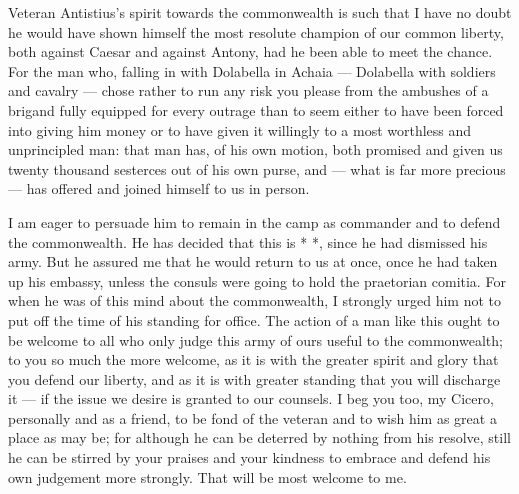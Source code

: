 

 Veteran Antistius's spirit towards the commonwealth is such that I have no doubt he would have shown himself the most resolute champion of our common liberty, both against Caesar and against Antony, had he been able to meet the chance. For the man who, falling in with Dolabella in Achaia --- Dolabella with soldiers and cavalry --- chose rather to run any risk you please from the ambushes of a brigand fully equipped for every outrage than to seem either to have been forced into giving him money or to have given it willingly to a most worthless and unprincipled man: that man has, of his own motion, both promised and given us twenty thousand sesterces out of his own purse, and --- what is far more precious --- has offered and joined himself to us in person.

 I am eager to persuade him to remain in the camp as commander and to defend the commonwealth. He has decided that this is *  *, since he had dismissed his army. But he assured me that he would return to us at once, once he had taken up his embassy, unless the consuls were going to hold the praetorian comitia. For when he was of this mind about the commonwealth, I strongly urged him not to put off the time of his standing for office. The action of a man like this ought to be welcome to all who only judge this army of ours useful to the commonwealth; to you so much the more welcome, as it is with the greater spirit and glory that you defend our liberty, and as it is with greater standing that you will discharge it --- if the issue we desire is granted to our counsels. I beg you too, my Cicero, personally and as a friend, to be fond of the veteran and to wish him as great a place as may be; for although he can be deterred by nothing from his resolve, still he can be stirred by your praises and your kindness to embrace and defend his own judgement more strongly. That will be most welcome to me.
